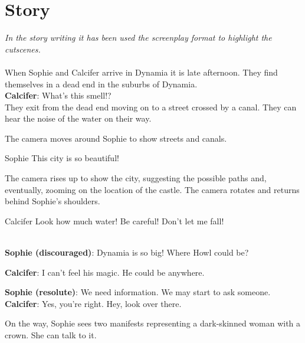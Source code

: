 \section{Story}

\noindent \textit{In the story writing it has been used the screenplay format to highlight the cutscenes.}\\\\

\noindent When Sophie and Calcifer arrive in Dynamia it is late afternoon. They find themselves in a dead end in the suburbs of Dynamia.\\

\textbf{Calcifer}: What’s this smell!?\\

\noindent They exit from the dead end moving on to a street crossed by a canal. They can hear the noise of the water on their way.

\begin{screenplay}

The camera  moves around Sophie to show streets and canals. 

\begin{dialogue}[amazed]{Sophie}
This city is so beautiful!
\end{dialogue}

The camera rises up to show the city, suggesting the possible paths and, eventually,  zooming on the location of the castle. The camera rotates and returns behind Sophie's shoulders. 

\begin{dialogue}[worried]{Calcifer}
Look how much water! Be careful! Don’t let me fall!
\end{dialogue}
\end{screenplay}

\noindent \\

\textbf{Sophie (discouraged)}: Dynamia is so big! Where Howl could be?

\textbf{Calcifer}: I can’t feel his magic. He could be anywhere.

\textbf{Sophie (resolute)}: We need information. We may start to ask someone.\\

\textbf{Calcifer}: Yes, you're right. Hey, look over there.

\noindent On the way, Sophie sees two manifests representing a dark-skinned woman with a crown. She can talk to it.\\

